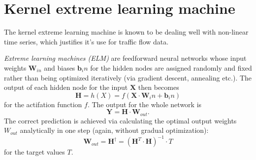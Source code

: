 \section{Kernel extreme learning machine}

The kernel extreme learning machine is known to be dealing well with
non-linear time series, which justifies it's use for traffic flow data.

\textit{Extreme learning machines (ELM)} are feedforward neural networks whose
input weights $\mathbf{W}_{in}$ and biases $\mathbf{b}_in$ for the hidden nodes
are assigned randomly and fixed rather than being optimized iteratively (via
gradient descent, annealing etc.). The output of each hidden node for the input
$\mathbf{X}$ then becomes
\begin{equation}
	\mathbf{H}=h(X)=f(\mathbf{X}\cdot\mathbf{W}_in+\mathbf{b}_in)
	\label{eq:H}
\end{equation}
for the actifation function $f$. The output for the whole network is
\begin{equation}
	\mathbf{Y}=\mathbf{H}\cdot\mathbf{W}_{out}.
	\label{eq:Y_elm}
\end{equation}
The correct prediction is achieved via calculating the optimal output weights
$W_{out}$ analytically in one step (again, without gradual optimization):
\begin{equation}
	\mathbf{W}_{out}=
	\mathbf{H}^\dagger=(\mathbf{H}^T\cdot\mathbf{H})^{-1}\cdot T
	\label{eq:W_out}
\end{equation}
for the target values $T$.

